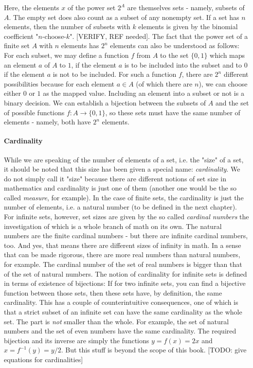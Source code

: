 Here, the elements $x$ of the power set $2^A$ are themselves sets - namely, subsets of $A$. The empty set does also count as a subset of any nonempty set. If a set has $n$ elements, then the number of subsets with $k$ elements is given by the binomial coefficient "$n$-choose-$k$". [VERIFY, REF needed]. The fact that the power set of a finite set $A$ with $n$ elements has $2^n$ elements can also be understood as follows: For each subset, we may define a function $f$ from $A$ to the set $\{0,1\}$ which maps an element $a$ of $A$ to $1$, if the element $a$ is to be included into the subset and to $0$ if the element $a$ is not to be included. For such a function $f$, there are $2^n$ different possibilities because for each element $a \in A$ (of which there are $n$), we can choose either $0$ or $1$ as the mapped value. Including an element into a subset or not is a binary decision. We can establish a bijection between the subsets of $A$ and the set of possible functions $f: A \rightarrow \{0,1\}$, so these sets must have the same number of elements - namely, both have $2^n$ elements.

\paragraph{Cardinality} While we are speaking of the number of elements of a set, i.e. the "size" of a set, it should be noted that this size has been given a special name: \emph{cardinality}. We do not simply call it "size" because there are different notions of set size in mathematics and cardinality is just one of them (another one would be the so called \emph{measure}, for example). In the case of finite sets, the cardinality is just the number of elements, i.e. a natural number (to be defined in the next chapter). For infinite sets, however, set sizes are given by the so called \emph{cardinal numbers} the investigation of which is a whole branch of math on its own. The natural numbers are the finite cardinal numbers - but there are infinite cardinal numbers, too. And yes, that means there are different sizes of infinity in math. In a sense that can be made rigorous, there are more real numbers than natural numbers, for example. The cardinal number of the set of real numbers is bigger than that of the set of natural numbers. The notion of cardinality for infinite sets is defined in terms of existence of bijections: If for two infinite sets, you can find a bijective function between those sets, then these sets have, by definition, the same cardinality. This has a couple of counterintuitive consequences, one of which is that a strict subset of an infinite set can have the same cardinality as the whole set. The part is \emph{not} smaller than the whole. For example, the set of natural numbers and the set of even numbers have the same cardinality. The required bijection and its inverse are simply the functions $y = f(x) = 2 x$ and $x = f^{-1}(y) = y / 2$. But this stuff is beyond the scope of this book. [TODO: give equations for cardinalities]

